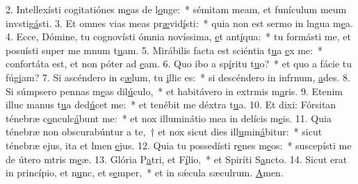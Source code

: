 2. Intellexísti cogitatiónes m\uline{e}as de l\uline{o}nge:~* sémitam meam, et funículum meum invstig\uline{á}sti.
3. Et omnes vias meas pr\uline{æ}vid\uline{í}sti:~* quia non est sermo in lngua m\uline{e}a.
4. Ecce, Dómine, tu cognovísti ómnia novíssima, \uline{e}t ant\uline{í}qua:~* tu formásti me, et posuísti super me mnum t\uline{u}am.
5. Mirábilis facta est sciéntia t\uline{u}a \uline{e}x me:~* confortáta est, et non póter ad \uline{e}am.
6. Quo ibo a sp\uline{í}ritu t\uline{u}o?~* et quo a fácie tu fúg\uline{i}am?
7. Si ascéndero in c\uline{æ}lum, tu \uline{i}llic es:~* si descéndero in infrnum, \uline{a}des.
8. Si súmpsero pennas m\uline{e}as dil\uline{ú}culo,~* et habitávero in extrmis m\uline{a}ris.
9. Etenim illuc manus t\uline{u}a ded\uline{ú}cet me:~* et tenébit me déxtra t\uline{u}a.
10. Et dixi: Fórsitan ténebræ c\uline{o}nculc\uline{á}bunt me:~* et nox illuminátio mea in delícis m\uline{e}is.
11. Quia ténebræ non obscurabúntur a te,~† et nox sicut dies ill\uline{u}min\uline{á}bitur:~* sicut ténebræ ejus, ita et lmen \uline{e}jus.
12. Quia tu possedísti r\uline{e}nes m\uline{e}os:~* suscepísti me de útero mtris m\uline{e}æ.
13. Glória P\uline{a}tri, et F\uline{í}lio,~* et Spiríti S\uline{a}ncto.
14. Sicut erat in princípio, et n\uline{u}nc, et s\uline{e}mper,~* et in sǽcula sæculrum. \uline{A}men.
